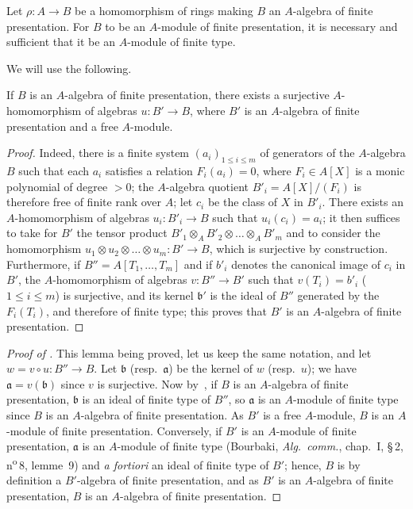 \begin{proposition}[1.4.7]
\label{IV.1.4.7}
Let $\rho:A\to B$ be a homomorphism of rings making $B$ an $A$-algebra of finite presentation.
For $B$ to be an $A$-module of finite presentation, it is necessary and sufficient that it be an $A$-module of finite type.
\end{proposition}

We will use the following.

\begin{lemma}[1.4.7.1]
\label{IV.1.4.7.1}
If $B$ is an $A$-algebra of finite presentation, there exists a surjective $A$-homomorphism of algebras $u:B'\to B$, where $B'$ is an $A$-algebra of finite presentation and a free $A$-module.
\end{lemma}

\begin{proof}
Indeed, there is a finite system $(a_i)_{1\leq i\leq m}$ of generators of the $A$-algebra $B$ such that each $a_i$ satisfies a relation $F_i(a_i)=0$, where $F_i\in A[X]$ is a monic polynomial of degree $>0$; the $A$-algebra quotient $B'_i=A[X]/(F_i)$ is therefore free of finite rank over $A$; let $c_i$ be the class of $X$ in $B'_i$.
There exists an $A$-homomorphism of algebras $u_i:B'_i\to B$ such that $u_i(c_i)=a_i$; it then suffices to take for $B'$ the tensor product $B'_1\otimes_A B'_2\otimes\ldots\otimes_A B'_m$ and to consider the homomorphism $u_1\otimes u_2\otimes\ldots\otimes u_m:B'\to B$, which is surjective by construction.
Furthermore, if $B''=A[T_1,\ldots,T_m]$ and if $b'_i$ denotes the canonical image of $c_i$ in $B'$, the $A$-homomorphism of algebras $v:B''\to B'$ such that $v(T_i)=b'_i$ ($1\leq i\leq m$) is surjective, and its kernel $\mathfrak{b}'$ is the ideal of $B''$ generated by the $F_i(T_i)$, and therefore of finite type; this proves that $B'$ is an $A$-algebra of finite presentation.
\end{proof}

\begin{proof}[Proof of {\rm{}}]
This lemma being proved, let us keep the same notation, and let $w=v\circ u:B''\to B$.
Let $\mathfrak{b}$ (resp.~$\mathfrak{a}$) be the kernel of $w$ (resp.~$u$); we have $\mathfrak{a}=v(\mathfrak{b})$ since $v$ is surjective.
Now by~, if $B$ is an $A$-algebra of finite presentation, $\mathfrak{b}$ is an ideal of finite type of $B''$, so $\mathfrak{a}$ is an $A$-module of finite type since $B$ is an $A$-algebra of finite presentation.
As $B'$ is a free $A$-module, $B$ is an $A$-module of finite presentation.
Conversely, if $B'$ is an $A$-module of finite presentation, $\mathfrak{a}$ is an $A$-module of finite type (Bourbaki, \emph{Alg.~comm.}, chap.~I, \S\,2, n\textsuperscript{o}\,8, lemme~9) and \emph{a fortiori} an ideal of finite type of $B'$; hence, $B$ is by definition a $B'$-algebra of finite presentation, and as $B'$ is an $A$-algebra of finite presentation, $B$ is an $A$-algebra of finite presentation.
\end{proof}

